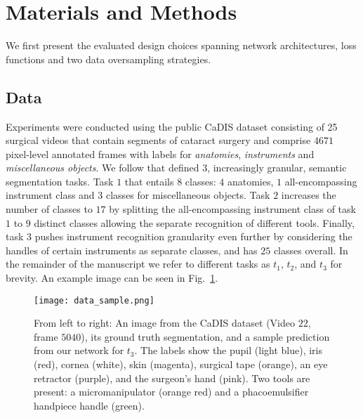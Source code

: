 \documentclass[runningheads]{llncs}
\newcommand{\ta}[1]{\textbf{$t_{#1}$}}
\begin{document}
\section{Materials and Methods}\label{methods}
We first present the evaluated design choices spanning network architectures, loss functions and two data oversampling strategies.

\subsection{Data}\label{methods:data}
Experiments were conducted using the public CaDIS dataset \cite{CaDIS} consisting of 25 surgical videos that contain segments of cataract surgery and comprise $4671$ pixel-level annotated frames with labels for \textit{anatomies}, \textit{instruments} and \textit{miscellaneous objects}. We follow \cite{CaDIS} that defined $3$, increasingly granular, semantic segmentation tasks. Task $1$ that entails $8$ classes: $4$ anatomies, $1$ all-encompassing instrument class and $3$ classes for miscellaneous objects. Task $2$ increases the number of classes to $17$ by splitting the all-encompassing instrument class of task $1$ to $9$ distinct classes allowing the separate recognition of different tools. Finally, task $3$ pushes instrument recognition granularity even further by considering the handles of certain instruments as separate classes, and has $25$ classes overall. In the remainder of the manuscript we refer to different tasks as \ta1, \ta2, and \ta3 for brevity. An example image can be seen in Fig.~\ref{fig:data}.

\begin{figure}[b]
    \centering
    \texttt{[image: data\_sample.png]}
    \caption{From left to right: An image from the CaDIS dataset (Video $22$, frame $5040$), its ground truth segmentation, and a sample prediction from our network for \ta3. The labels show the pupil (light blue), iris (red), cornea (white), skin (magenta), surgical tape (orange), an eye retractor (purple), and the surgeon's hand (pink). Two tools are present: a micromanipulator (orange red) and a phacoemulsifier handpiece handle (green).}
    \label{fig:data}
\end{figure}
\end{document}
